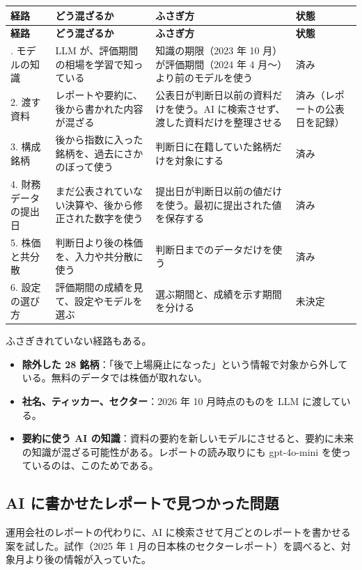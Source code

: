\documentclass[xelatex,ja=standard,jafont=hiragino-pron,a4paper,10pt]{bxjsreport}
\begin{document}
\begin{longtable}{p{2.80cm}p{4.60cm}p{5.00cm}p{2.00cm}}
\toprule
\textbf{経路} & \textbf{どう混ざるか} & \textbf{ふさぎ方} & \textbf{状態} \\
\midrule
\endfirsthead
\toprule
\textbf{経路} & \textbf{どう混ざるか} & \textbf{ふさぎ方} & \textbf{状態} \\
\midrule
\endhead
\bottomrule
\endfoot
1. モデルの知識 & LLM が、評価期間の相場を学習で知っている & 知識の期限（2023 年 10 月）が評価期間（2024 年 4 月〜）より前のモデルを使う & 済み \\
2. 渡す資料 & レポートや要約に、後から書かれた内容が混ざる & 公表日が判断日以前の資料だけを使う。AI に検索させず、渡した資料だけを整理させる & 済み（レポートの公表日を記録） \\
3. 構成銘柄 & 後から指数に入った銘柄を、過去にさかのぼって使う & 判断日に在籍していた銘柄だけを対象にする & 済み \\
4. 財務データの提出日 & まだ公表されていない決算や、後から修正された数字を使う & 提出日が判断日以前の値だけを使う。最初に提出された値を保存する & 済み \\
5. 株価と共分散 & 判断日より後の株価を、入力や共分散に使う & 判断日までのデータだけを使う & 済み \\
6. 設定の選び方 & 評価期間の成績を見て、設定やモデルを選ぶ & 選ぶ期間と、成績を示す期間を分ける & 未決定 \\
\end{longtable}

ふさぎきれていない経路もある。

\begin{itemize}
\item \textbf{除外した 28 銘柄}：「後で上場廃止になった」という情報で対象から外している。無料のデータでは株価が取れない。
\item \textbf{社名、ティッカー、セクター}：2026 年 10 月時点のものを LLM に渡している。
\item \textbf{要約に使う AI の知識}：資料の要約を新しいモデルにさせると、要約に未来の知識が混ざる可能性がある。レポートの読み取りにも gpt-4o-mini を使っているのは、このためである。
\end{itemize}

\subsection{AI に書かせたレポートで見つかった問題}

運用会社のレポートの代わりに、AI に検索させて月ごとのレポートを書かせる案を試した。試作（2025 年 1 月の日本株のセクターレポート）を調べると、対象月より後の情報が入っていた。
\end{document}
